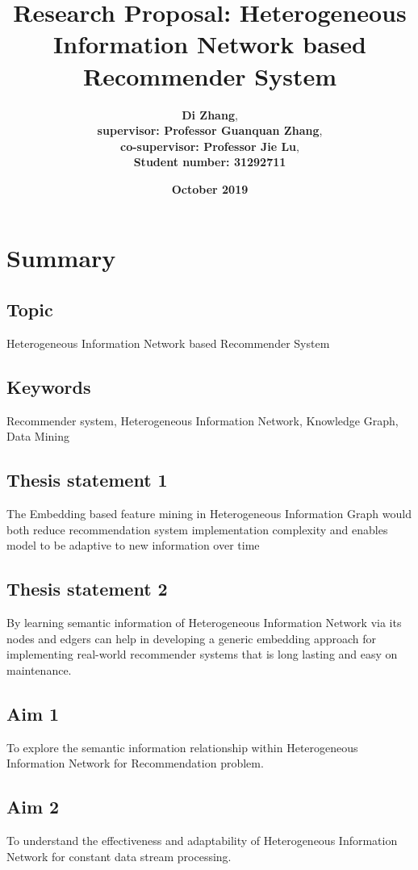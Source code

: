 \documentclass[12pt,a4 paper,title page]{article}
\title{Research Proposal: Heterogeneous Information Network based Recommender System}
\author{\large\textbf{Di Zhang}, \\
\textbf{supervisor: Professor Guanquan Zhang}, \\
\textbf{co-supervisor: Professor Jie Lu}, \\
\textbf{Student number: 31292711}}
\date{\Large{\textbf{October 2019}}}
\begin{document}
\sloppy
\maketitle
\hfill
\hfill

\section*{Summary}

\subsection*{Topic} Heterogeneous Information Network based Recommender System

\subsection*{Keywords} 

Recommender system, Heterogeneous Information Network, Knowledge Graph, Data Mining 

\subsection*{Thesis statement 1}
The Embedding based feature mining in Heterogeneous Information Graph would both reduce recommendation system implementation complexity and enables model to be adaptive to new information over time

\subsection*{Thesis statement 2}
By learning semantic information of Heterogeneous Information Network via its nodes and edgers can help in developing a generic embedding approach for implementing real-world recommender systems that is long lasting and easy on maintenance. 

\subsection*{Aim 1}
To explore the semantic information relationship within Heterogeneous Information Network for Recommendation problem.

\subsection*{Aim 2}
To understand the effectiveness and adaptability of Heterogeneous Information Network for constant data stream processing. 
\end{document}
